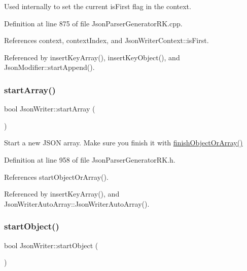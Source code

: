 Used internally to set the current is\+First flag in the context. 



Definition at line 875 of file Json\+Parser\+Generator\+R\+K.\+cpp.



References context, context\+Index, and Json\+Writer\+Context\+::is\+First.



Referenced by insert\+Key\+Array(), insert\+Key\+Object(), and Json\+Modifier\+::start\+Append().

\mbox{\label{class_json_writer_a7ccfcbf66a8ed9a2728e6f6ae4b705ec}} 
\subsubsection{\texorpdfstring{start\+Array()}{startArray()}}
{\footnotesize\ttfamily bool Json\+Writer\+::start\+Array (\begin{DoxyParamCaption}{ }\end{DoxyParamCaption})\hspace{0.3cm}{\ttfamily [inline]}}



Start a new J\+S\+ON array. Make sure you finish it with \hyperlink{class_json_writer_adbd96b46b0679bea3a066c0e62bd86b0}{finish\+Object\+Or\+Array()} 



Definition at line 958 of file Json\+Parser\+Generator\+R\+K.\+h.



References start\+Object\+Or\+Array().



Referenced by insert\+Key\+Array(), and Json\+Writer\+Auto\+Array\+::\+Json\+Writer\+Auto\+Array().

\mbox{\label{class_json_writer_a43d1a78bf211a2f12cfe9253462717ae}} 
\subsubsection{\texorpdfstring{start\+Object()}{startObject()}}
{\footnotesize\ttfamily bool Json\+Writer\+::start\+Object (\begin{DoxyParamCaption}{ }\end{DoxyParamCaption})\hspace{0.3cm}{\ttfamily [inline]}}




